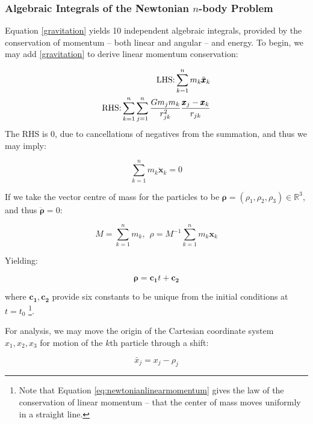 \subsubsection{Algebraic Integrals of the Newtonian $n$-body Problem}

Equation \ref{gravitation} yields 10 independent algebraic integrals, provided by the conservation of momentum -- both linear and angular -- and energy. To begin, we may add \ref{gravitation} to derive linear momentum conservation:

\begin{align}\label{eq:addedgravitation}
\textnormal{LHS:} \sum_{k=1}^n m_k\ddot{\pmb{x}}_k \\
\textnormal{RHS:} \sum_{k=1}^n \sum_{j=1}^n \frac{Gm_j m_k}{r^2_{jk}} \frac{\pmb{x}_j - \pmb{x}_k}{r_{jk}}
\end{align}
The RHS is 0, due to cancellations of negatives from the summation, and thus we may imply:

\begin{equation}\label{eq:zeroCoM}
\sum_{k=1}^n m_k \pmb{\ddot{x}}_k = 0
\end{equation}

\noindent If we take the vector centre of mass for the particles to be $\pmb{\rho} = (\rho_1, \rho_2, \rho_3) \in \mathbb{R}^3$, and thus $\pmb{\ddot{\rho}} = 0$:

\begin{equation}
M = \sum^n_{k=1} m_k, \hspace{5pt} \rho = M^{-1} \sum^n_{k=1} m_k \pmb{x}_k
\end{equation}

\noindent Yielding:

\begin{equation}\label{eq:newtonianlinearmomentum}
\pmb{\rho} = \pmb{c_1}t + \pmb{c_2}
\end{equation}

\noindent where $\pmb{c_1}, \pmb{c_2}$ provide six constants to be unique from the initial conditions at $t = t_0$ \footnote{Note that Equation \ref{eq:newtonianlinearmomentum} gives the law of the conservation of linear momentum -- that the center of mass moves uniformly in a straight line.}.

For analysis, we may move the origin of the Cartesian coordinate system $x_1, x_2, x_3$ for motion of the $k$th particle through a shift:

\begin{equation}
\bar{x}_j = x_j - \rho_j
\end{equation}

